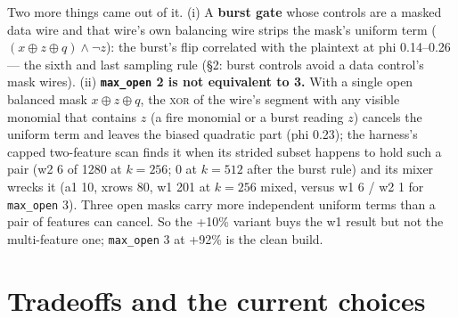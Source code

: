 \documentclass[11pt]{article}
\newcommand{\doc}[1]{\texttt{#1}}
\newcommand{\xor}{\oplus}
\begin{document}
Two more things came out of it. (i) A \textbf{burst gate} whose controls are a
masked data wire and that wire's own balancing wire strips the mask's uniform
term ($(x \xor z \xor q) \wedge \neg z$): the burst's flip correlated with the
plaintext at phi 0.14--0.26 --- the sixth and last sampling rule (\S2: burst
controls avoid a data control's mask wires). (ii) \textbf{\doc{max\_open} 2 is not
equivalent to 3.} With a single open balanced mask $x \xor z \xor q$, the
\textsc{xor} of the wire's segment with any visible monomial that contains $z$ (a
fire monomial or a burst reading $z$) cancels the uniform term and leaves the
biased quadratic part (phi 0.23); the harness's capped two-feature scan finds it
when its strided subset happens to hold such a pair (w2 6 of 1280 at $k=256$; 0 at
$k=512$ after the burst rule) and its mixer wrecks it (a1 10, xrows 80, w1 201 at
$k=256$ mixed, versus w1 6 / w2 1 for \doc{max\_open} 3). Three open masks carry
more independent uniform terms than a pair of features can cancel. So the +10\%
variant buys the w1 result but not the multi-feature one; \doc{max\_open} 3 at
+92\% is the clean build.

\section{Tradeoffs and the current choices}
\end{document}
